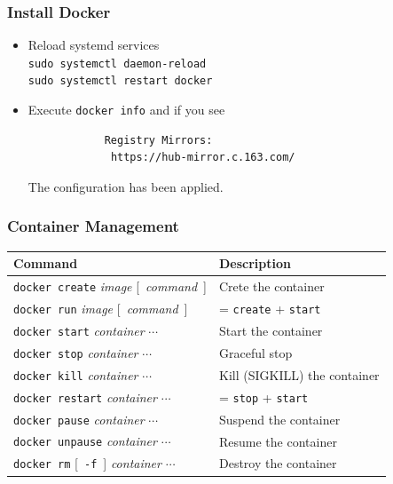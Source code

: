 \documentclass[aspectratio=169]{beamer}
\begin{document}
\begin{frame}[fragile,t]
\frametitle{Install Docker}
	\begin{itemize}
		\item Reload systemd services \\
		\verb+sudo systemctl daemon-reload+ \\
		\verb+sudo systemctl restart docker+
		\item Execute \verb+docker info+ and if you see \\
		\begin{verbatim}
			Registry Mirrors:
			 https://hub-mirror.c.163.com/
		\end{verbatim}
		The configuration has been applied.
	\end{itemize}
\end{frame}

\begin{frame}
\frametitle{Container Management}
\begin{table}[hbp]
		\center
		\begin{tabular}{ll}
			\toprule
			\textbf{Command} & \textbf{Description} \\
			\midrule
			\texttt{docker\ create} \textit{image} [\ \textit{command}\ ] &  Crete the container \\
			\texttt{docker\ run} \textit{image} [\ \textit{command}\ ]  & = \texttt{create} + \texttt{start}  \\ 
			\midrule
			\texttt{docker\ start} \textit{container} $\cdots$ & Start the container\\
			\texttt{docker\ stop} \textit{container} $\cdots$ & Graceful stop\\
			\texttt{docker\ kill} \textit{container} $\cdots$ & Kill (SIGKILL) the container\\
			\texttt{docker\ restart} \textit{container} $\cdots$ & = \texttt{stop} + \texttt{start} \\
			\midrule
			\texttt{docker\ pause} \textit{container} $\cdots$ & Suspend the container \\
			\texttt{docker\ unpause} \textit{container} $\cdots$ & Resume the container \\
			\midrule
			\texttt{docker\ rm} [\ \texttt{-f}\ ] \textit{container} $\cdots$ & Destroy the container \\
			\bottomrule
		\end{tabular}
	\end{table}
\end{frame}
\end{document}

